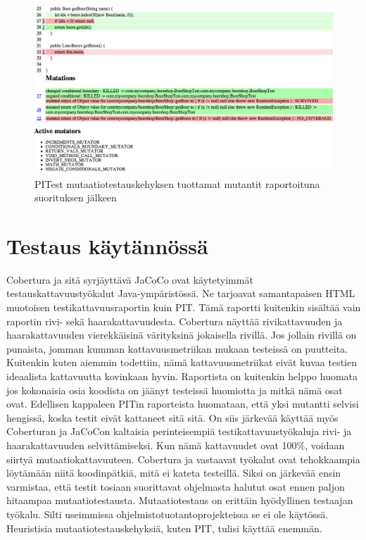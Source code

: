 \documentclass[finnish]{tktltiki2}
\begin{document}
\begin{figure}[here]
\centering
\caption{PITest mutaatiotestauskehyksen tuottamat mutantit raportoituna suorituksen jälkeen}
\label{fig:mutantit}
\includegraphics[width=1.0\textwidth]{freimarikuvat/mutantit_cropped.png}
\end{figure}

\section{Testaus käytännössä}
Cobertura ja sitä syrjäyttävä JaCoCo ovat käytetyimmät testauskattavuustyökalut Java-ympäristössä. Ne tarjoavat samantapaisen HTML muotoisen testikattavuusraportin kuin PIT. Tämä raportti kuitenkin sisältää vain raportin rivi- sekä haarakattavuudesta. Cobertura näyttää rivikattavuuden ja haarakattavuuden vierekkäisinä värityksinä jokaisella rivillä. Jos jollain rivillä on punaista, jomman kumman kattavuusmetriikan mukaan testeissä on puutteita. Kuitenkin kuten aiemmin todettiin, nämä kattavuusmetriikat eivät kuvaa testien ideaalista kattavuutta kovinkaan hyvin. Raportista on kuitenkin helppo huomata jos kokonaisia osia koodista on jäänyt testeissä huomiotta ja mitkä nämä osat ovat. Edellisen kappaleen PITin raporteista huomataan, että yksi mutantti selvisi hengissä, koska testit eivät kattaneet sitä sitä. On siis järkevää käyttää myös Coberturan ja JaCoCon kaltaisia perinteisempiä testikattavuustyökaluja rivi- ja haarakattavuuden selvittämiseksi. Kun nämä kattavuudet ovat 100\%, voidaan siirtyä mutaatiokattavuuteen. Cobertura ja vastaavat työkalut ovat tehokkaampia löytämään niitä koodinpätkiä, mitä ei kateta testeillä. Siksi on järkevää ensin varmistaa, että testit tosiaan suorittavat ohjelmasta halutut osat ennen paljon hitaampaa mutaatiotestausta. Mutaatiotestaus on erittäin hyödyllinen testaajan työkalu. Silti useimmissa ohjelmistotuotantoprojekteissa se ei ole käytössä. Heuristisia mutaatiotestauskehyksiä, kuten PIT, tulisi käyttää enemmän. 
\end{document}
